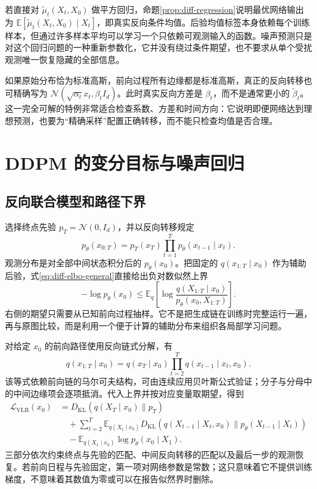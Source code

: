 \documentclass[UTF8,12pt,a4paper,fontset=fandol]{ctexart}
\begin{document}
若直接对 $\widetilde\mu_t(X_t,X_0)$ 做平方回归，命题\ref{prop:diff-regression}说明最优网络输出为 $\mathbb E[\widetilde\mu_t(X_t,X_0)\mid X_t]$，即真实反向条件均值。后验均值标签本身依赖每个训练样本，但通过许多样本平均可以学习一个只依赖可观测输入的函数。噪声预测只是对这个回归问题的一种重新参数化，它并没有绕过条件期望，也不要求从单个受扰观测唯一恢复隐藏的全部信息。

如果原始分布恰为标准高斯，前向过程所有边缘都是标准高斯，真正的反向转移也可精确写为 $\mathcal N(\sqrt{\alpha_t}x_t,\beta_t I_d)$。此时真实反向方差是 $\beta_t$，而不是通常更小的 $\widetilde\beta_t$。这一完全可解的特例非常适合检查系数、方差和时间方向：它说明即便网络达到理想预测，也要为“精确采样”配置正确转移，而不能只检查均值是否合理。

\section{DDPM 的变分目标与噪声回归}
\label{sec:diff-ddpm-loss}
\subsection{反向联合模型和路径下界}
选择终点先验 $p_T=\mathcal N(0,I_d)$，并以反向转移规定
\begin{equation}
 p_\theta(x_{0:T})=p_T(x_T)\prod_{t=1}^{T}p_\theta(x_{t-1}\mid x_t).
 \label{eq:diff-generative-joint}
\end{equation}
观测分布是对全部中间状态积分后的 $p_\theta(x_0)$。把固定的 $q(x_{1:T}\mid x_0)$ 作为辅助后验，式\eqref{eq:diff-elbo-general}直接给出负对数似然上界
\[
 -\log p_\theta(x_0)\leq
 \mathbb E_q\left[\log\frac{q(X_{1:T}\mid x_0)}{p_\theta(x_0,X_{1:T})}\right].
\]
右侧的期望只需要从已知前向过程抽样。它不是把生成链在训练时完整运行一遍，再与原图比较，而是利用一个便于计算的辅助分布来组织各局部学习问题。

对给定 $x_0$ 的前向路径使用反向链式分解，有
\[
 q(x_{1:T}\mid x_0)=q(x_T\mid x_0)\prod_{t=2}^{T}q(x_{t-1}\mid x_t,x_0).
\]
该等式依赖前向链的马尔可夫结构，可由连续应用贝叶斯公式验证；分子与分母中的中间边缘项会逐项抵消。代入上界并按对应变量取期望，得到
\begin{align}
 \mathcal L_{\mathrm{VLB}}(x_0)
 &=D_{\mathrm{KL}}(q(X_T\mid x_0)\|p_T)\nonumber\\
 &\quad+\sum_{t=2}^{T}\mathbb E_{q(X_t\mid x_0)}
 D_{\mathrm{KL}}(q(X_{t-1}\mid X_t,x_0)\|p_\theta(X_{t-1}\mid X_t))\nonumber\\
 &\quad-\mathbb E_{q(X_1\mid x_0)}\log p_\theta(x_0\mid X_1).
 \label{eq:diff-vlb}
\end{align}
三部分依次约束终点与先验的匹配、中间反向转移的匹配以及最后一步的观测恢复。若前向日程与先验固定，第一项对网络参数是常数；这只意味着它不提供训练梯度，不意味着其数值为零或可以在报告似然界时删除。
\end{document}
